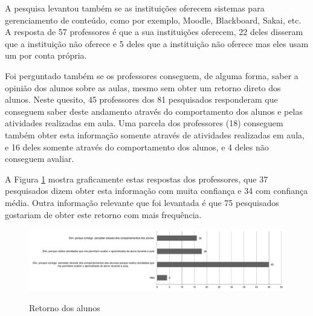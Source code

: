 A pesquisa levantou também se as instituições oferecem sistemas para gerenciamento de conteúdo, como por exemplo, Moodle, Blackboard, Sakai, etc. A resposta de 57 professores é que a sua instituições oferecem, 22 deles disseram que a instituição não oferece e 5 deles que a instituição não oferece mas eles usam um por conta própria. 




Foi perguntado também se os professores conseguem, de alguma forma, saber a opinião dos alunos sobre as aulas, mesmo sem obter um retorno direto dos alunos. Neste quesito, 45 professores dos 81 pesquisados responderam que conseguem saber deste andamento através do comportamento dos alunos e pelas atividades realizadas em aula. Uma parcela dos professores (18) conseguem também obter esta informação somente através de atividades realizadas em aula, e 16 deles somente através do comportamento dos alunos, e 4 deles não conseguem avaliar.

A Figura \ref{fig:grafico_retorno} mostra graficamente estas respostas dos professores, que 37 pesquisados dizem obter esta informação com muita confiança e 34 com confiança média. Outra informação relevante que foi levantada é que 75 pesquisados gostariam de obter este retorno com mais frequência.

\begin{figure}
\centering
\caption{Retorno dos alunos}
\includegraphics[width=1.0\textwidth]{pdfs/alunos-professores/pesquisa-retorno-alunos.pdf} 
\label{fig:grafico_retorno} 
\end{figure}

